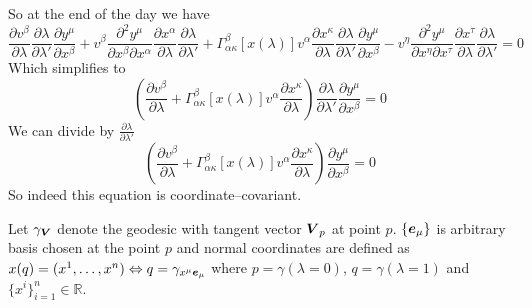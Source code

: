 %
So at the end of the day we have
%
\begin{equation}
    \frac{\partial v^\beta}{\partial\lambda}
    \frac{\partial \lambda}{\partial \lambda'}
    \frac{\partial y^\mu}{\partial x^\beta} +
    v^\beta\frac{\partial^2 y^\mu}{\partial x^\beta \partial x^\alpha}
    \frac{\partial x^\alpha}{\partial \lambda}
    \frac{\partial \lambda}{\partial \lambda'}+
    \Gamma_{\alpha\kappa}^\beta\left[x(\lambda)\right]v^\alpha
    \frac{\partial x^\kappa}{\partial \lambda}
    \frac{\partial \lambda}{\partial \lambda'}
    \frac{\partial y^\mu}{\partial x^\beta}-
    v^\eta\frac{\partial^2 y^\mu}{\partial x^\eta \partial x^\tau}
    \frac{\partial x^\tau}{\partial \lambda}
    \frac{\partial \lambda}{\partial \lambda'} = 0
\end{equation}
%
Which simplifies to
%
\begin{equation}
    \left(\frac{\partial v^\beta}{\partial\lambda} +
    \Gamma_{\alpha\kappa}^\beta\left[x(\lambda)\right]v^\alpha
    \frac{\partial x^\kappa}{\partial \lambda}\right)
    \frac{\partial \lambda}{\partial \lambda'}
    \frac{\partial y^\mu}{\partial x^\beta} = 0
\end{equation}
%
We can divide by $\frac{\partial \lambda}{\partial \lambda'}$
%
\begin{equation}
    \boxed{\left(\frac{\partial v^\beta}{\partial\lambda} +
        \Gamma_{\alpha\kappa}^\beta\left[x(\lambda)\right]v^\alpha
        \frac{\partial x^\kappa}{\partial \lambda}\right)
        \frac{\partial y^\mu}{\partial x^\beta} = 0}
\end{equation}
%
So indeed this equation is coordinate--covariant.

\problem

Let $\gamma_{\boldsymbol{V}}$ denote the geodesic with tangent vector $\boldsymbol{V}_p$ at
point $p$. $\{\boldsymbol{e}_\mu\}$ is arbitrary basis chosen at the point $p$ and
normal coordinates are defined as $x(q)=(x^1,\dots,x^n) \Leftrightarrow
    q=\gamma_{x^\mu \boldsymbol{e}_\mu}$ where $p=\gamma(\lambda=0)$, $q=\gamma(\lambda=1)$
and $\{x^i\}_{i=1}^n \in \mathbb{R}$.

